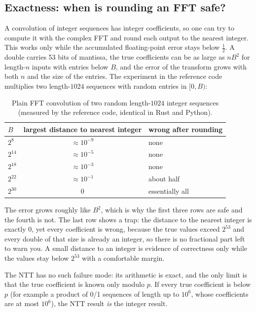 \documentclass[11pt]{article}
\begin{document}
\subsection{Exactness: when is rounding an FFT safe?}
A convolution of integer sequences has integer coefficients, so one can try to compute it with the complex FFT and round each output to the nearest integer.
This works only while the accumulated floating-point error stays below $\tfrac12$. A double carries 53 bits of mantissa, the true coefficients can be as large
as $nB^2$ for length-$n$ inputs with entries below $B$, and the error of the transform grows with both $n$ and the size of the entries.
The experiment in the reference code multiplies two length-$1024$ sequences with random entries in $[0,B)$:

\begin{table}[H]
\centering
\small\sffamily\renewcommand{\arraystretch}{1.25}
\begin{tabular}{@{}lcl@{}}
\toprule
$B$ & largest distance to nearest integer & wrong after rounding \\
\midrule
$2^{8}$ & $\approx 10^{-9}$ & none \\
$2^{14}$ & $\approx 10^{-5}$ & none \\
$2^{18}$ & $\approx 10^{-3}$ & none \\
$2^{22}$ & $\approx 10^{-1}$ & about half \\
$2^{30}$ & $0$ & essentially all \\
\bottomrule
\end{tabular}
\caption{Plain FFT convolution of two random length-$1024$ integer sequences (measured by the reference code, identical in Rust and Python).}
\label{tab:fft-error}
\end{table}

The error grows roughly like $B^2$, which is why the first three rows are safe and the fourth is not. The last row shows a trap: the distance to the nearest integer is exactly $0$,
yet every coefficient is wrong, because the true values exceed $2^{53}$ and every double of that size is already an integer, so there is no fractional part left to warn you.
A small distance to an integer is evidence of correctness only while the values stay below $2^{53}$ with a comfortable margin.

The NTT has no such failure mode: its arithmetic is exact, and the only limit is that the true coefficient is known only modulo $p$. If every true coefficient is below $p$
(for example a product of 0/1 sequences of length up to $10^6$, whose coefficients are at most $10^6$), the NTT result \emph{is} the integer result.
\end{document}
